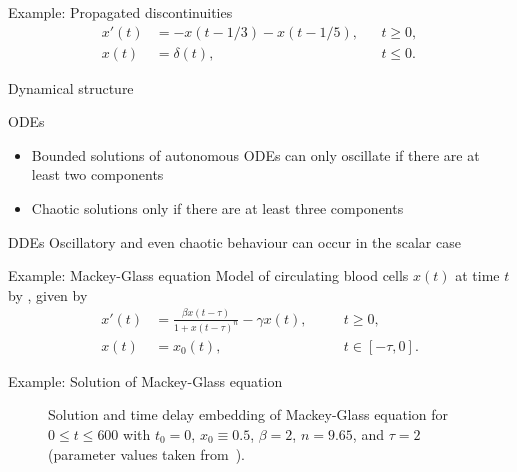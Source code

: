 \documentclass[aspectratio=169]{beamer}
\begin{document}
\begin{frame}{Example: Propagated discontinuities}
  \begin{align*}
    x'(t) &= -x(t - 1/3) - x(t - 1/5), && t \geq 0,\\
    x(t) &= \delta(t), && t \leq 0.
  \end{align*}

  \begin{figure}[htbp]
    \begin{center}
      \pgfplotsset{width=0.9\textwidth,height=0.7\textheight}
      
    \end{center}
  \end{figure}
\end{frame}

\begin{frame}{Dynamical structure}
  \begin{block}{ODEs}
    \begin{itemize}
    \item Bounded solutions of autonomous ODEs can only oscillate if there are at least two components
    \item Chaotic solutions only if there are at least three components
    \end{itemize}
  \end{block}

  \pause

  \begin{block}{DDEs}
    Oscillatory and even chaotic behaviour can occur in the scalar case
  \end{block}
\end{frame}

\begin{frame}{Example: Mackey-Glass equation}
  Model of circulating blood cells $x(t)$ at time $t$ by \textcite{mackey77_oscil_chaos_physiol_contr_system}, given by
  \begin{align*}
    x'(t) &= \frac{\beta x(t-\tau)}{1 + {x(t-\tau)}^n} - \gamma x(t), \quad &&t \geq 0,\\
    x(t) &= x_0(t), \quad &&t \in [-\tau, 0].
  \end{align*}
\end{frame}

\begin{frame}{Example: Solution of Mackey-Glass equation}
  \begin{figure}[hbt]
    \begin{center}
      \pgfplotsset{width=0.45\textwidth,height=0.7\textheight}
      
      \caption{\label{fig:mackey_glass}Solution and time delay embedding of Mackey-Glass equation for $0 \leq t \leq 600$ with $t_0 = 0$, $x_0 \equiv 0.5$, $\beta = 2$, $n = 9.65$, and $\tau = 2$ (parameter values taken from~\textcite{glass10_mackey_glass_equat}).}
    \end{center}
  \end{figure}
\end{frame}
\end{document}
